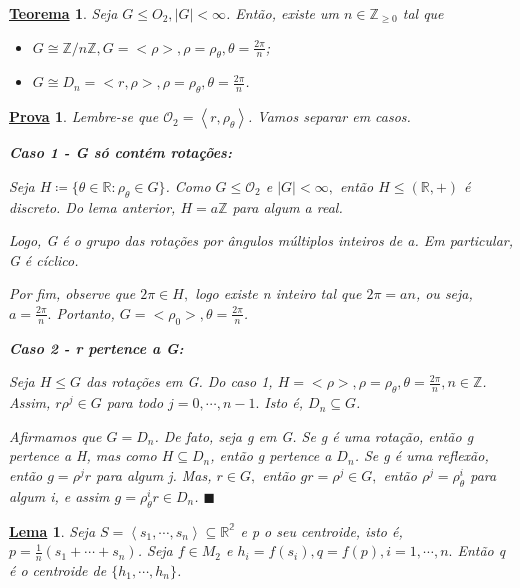 \documentclass{article}
\newtheorem*{theorem*}{\underline{Teorema}}
\newtheorem*{proof*}{\underline{Prova}}
\newtheorem*{lemma*}{\underline{Lema}}
\renewcommand\qedsymbol{$\blacksquare$}
\begin{document}
\begin{theorem*}
  Seja \(G\leq O_{2}, |G| < \infty\). Então, existe um \(n\in \mathbb{Z}_{\geq 0}\) tal que 
 \begin{itemize}
   \item[a)] \(G\cong{\mathbb{Z}/n \mathbb{Z}}, G = <\rho >, \rho = \rho _{\theta }, \theta =\frac{2\pi }{n}\);
     \item[b)] \(G\cong{D_{n} = <r, \rho >}, \rho  = \rho _{\theta }, \theta =\frac{2\pi }{n}\).
 \end{itemize}
\end{theorem*}
\begin{proof*}
  Lembre-se que \(\mathcal{O}_{2} = \left< r, \rho _{\theta } \right>\). Vamos separar em casos.

  \textbf{Caso 1 - G só contém rota\c cões:}

  Seja \(H\coloneqq \{\theta \in \mathbb{R}: \rho _{\theta }\in G\}\). Como
  \(G\leq \mathcal{O}_{2}\) e \(|G| < \infty,\) então \(H\leq (\mathbb{R}, +)\)
  é discreto. Do lema anterior, \(H = a \mathbb{Z}\) para algum a real.

  Logo, G é o grupo das rota\c cões por ângulos múltiplos inteiros de a. Em
  particular, G é cíclico. 

  Por fim, observe que \(2\pi \in H,\) logo existe n inteiro tal que \(2\pi =an\),
  ou seja, \(a = \frac{2\pi }{n}.\) Portanto, \(G = <\rho_{0}>, \theta =\frac{2\pi }{n}\).

  \textbf{Caso 2 - r pertence a G:}

  Seja \(H\leq G\) das rota\c cões em G. Do caso 1, \(H = <\rho >, \rho = \rho _{\theta }, \theta =\frac{2\pi }{n}, n\in \mathbb{Z}\).
  Assim, \(r\rho^{j}\in G\) para todo \(j=0, \cdots, n-1.\) Isto é, \(D_{n}\subseteq{G}\).

  Afirmamos que \(G=D_{n}\). De fato, seja g em G. Se g é uma rota\c cão, então
  g pertence a H, mas como \(H\subseteq{D_{n}}\), então g pertence a \(D_{n}\).
  Se g é uma reflexão, então \(g=\rho^{j}r\) para algum j. Mas, \(r\in G,\) então
  \(gr = \rho^{j}\in G,\) então \(\rho ^{j}=\rho _{\theta }^{i}\) para algum i,
  e assim \(g=\rho _{\theta }^{i}r\in D_{n}\). \qedsymbol
\end{proof*}
\begin{lemma*}
  Seja \(S = \left< s_{1}, \cdots, s_{n} \right>\subseteq{\mathbb{R^{2}}}\) e
  p o seu centroide, isto é, \(p=\frac{1}{n}(s_{1} + \cdots + s_{n})\). Seja \(f\in M_{2}\)
  e \(h_{i}=f(s_{i}), q=f(p), i = 1,\cdots,n.\) Então q é o centroide de 
  \(\{h_{1}, \cdots, h_{n}\}\).
\end{lemma*}
\end{document}
